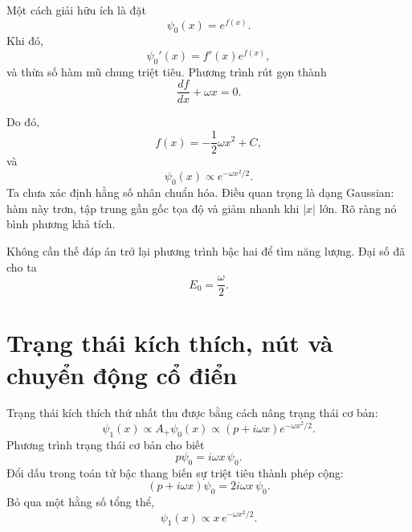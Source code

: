 \begin{classroomqa}
\end{classroomqa}

Một cách giải hữu ích là đặt
\begin{equation}
\psi_{0}(x)=e^{f(x)}.
\end{equation}
Khi đó,
\[
\psi_{0}'(x)=f'(x)e^{f(x)},
\]
và thừa số hàm mũ chung triệt tiêu. Phương trình rút gọn thành
\begin{equation}
\frac{df}{dx}+\omega x=0.
\end{equation}

\begin{classroomqa}
\end{classroomqa}

Do đó,
\begin{equation}
f(x)=-\frac12\omega x^{2}+C,
\end{equation}
và
\begin{equation}
\psi_{0}(x)\propto e^{-\omega x^{2}/2}.
\end{equation}
Ta chưa xác định hằng số nhân chuẩn hóa. Điều quan trọng là dạng Gaussian: hàm này trơn, tập trung gần gốc tọa độ và giảm nhanh khi \(\lvert x\rvert\) lớn. Rõ ràng nó bình phương khả tích.

Không cần thế đáp án trở lại phương trình bậc hai để tìm năng lượng. Đại số đã cho ta
\begin{equation}
E_{0}=\frac{\omega}{2}.
\end{equation}

\section{Trạng thái kích thích, nút và chuyển động cổ điển}

Trạng thái kích thích thứ nhất thu được bằng cách nâng trạng thái cơ bản:
\begin{equation}
\psi_{1}(x)\propto A_{+}\psi_{0}(x)
\propto(p+i\omega x)e^{-\omega x^{2}/2}.
\end{equation}
Phương trình trạng thái cơ bản cho biết
\[
p\psi_{0}=i\omega x\,\psi_{0}.
\]
Đổi dấu trong toán tử bậc thang biến sự triệt tiêu thành phép cộng:
\begin{equation}
(p+i\omega x)\psi_{0}
=2i\omega x\,\psi_{0}.
\end{equation}
Bỏ qua một hằng số tổng thể,
\begin{equation}
\psi_{1}(x)\propto x\,e^{-\omega x^{2}/2}.
\end{equation}

